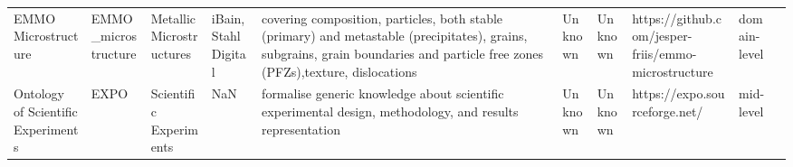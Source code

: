 \begin{tabular}{llllllllll}
                                                              EMMO Microstructure &     EMMO_microstructure &                    Metallic Microstructures &                                                                                                                                                                                                                                                                                                                                                  iBain, StahlDigital &                                                                                                                                                                                                                           covering composition, particles, both stable (primary) and metastable (precipitates), grains, subgrains, grain boundaries and particle free zones (PFZs),texture, dislocations &                                                                                                            Unknown &                                      Unknown &                                               https://github.com/jesper-friis/emmo-microstructure  &      domain-level \\
                                               Ontology of Scientific Experiments &                    EXPO &                      Scientific Experiments &                                                                                                                                                                                                                                                                                                                                                                  NaN &                                                                                                                                                                                                                                                                                              formalise generic knowledge about scientific experimental design, methodology, and results representation &                                                                                                            Unknown &                                      Unknown &                                                                      https://expo.sourceforge.net/ &         mid-level \\

\end{tabular}
